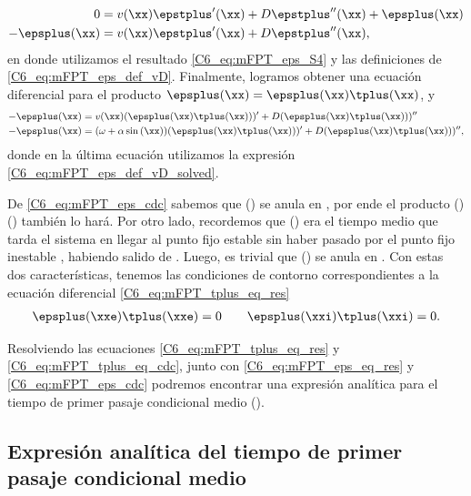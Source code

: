 {\begin{align}
       0 &= v(\xx) \epstplus'(\xx)  + D \epstplus''(\xx) + \epsplus(\xx)\\
       -\epsplus(\xx) &= v(\xx) \epstplus'(\xx)  + D \epstplus''(\xx),
\end{align}
en donde utilizamos el resultado \ref{C6_eq:mFPT_eps_S4} y las definiciones de \ref{C6_eq:mFPT_eps_def_vD}.
Finalmente, logramos obtener una ecuación diferencial para el producto $\epsplus(\xx) = \epsplus(\xx) \tplus(\xx)$, y
\begin{align}
       - \epsplus(\xx) &= v(\xx) (\epsplus(\xx) \tplus(\xx)))'  + D (\epsplus(\xx) \tplus(\xx)))''  \\
     - \epsplus(\xx) &= (\omega + \alpha \sin{(\xx)}) (\epsplus(\xx) \tplus(\xx)))'  + D (\epsplus(\xx) \tplus(\xx)))'' ,
       \label{C6_eq:mFPT_tplus_eq_res}
\end{align}
donde en la última ecuación utilizamos la expresión  \ref{C6_eq:mFPT_eps_def_vD_solved}.

De \ref{C6_eq:mFPT_eps_cdc} sabemos que \epsplus(\xx) se anula en \xxi, por ende el producto \epsplus(\xx) \tplus(\xx) también lo hará. Por otro lado, recordemos que \tplus(\xx) era el tiempo medio que tarda el sistema en llegar al punto fijo estable \xxe sin haber pasado por el punto fijo inestable \xxi, habiendo salido de \xx. Luego, es trivial que \tplus(\xx) se anula en \xxe. Con estas dos características, tenemos las condiciones de contorno correspondientes a la ecuación diferencial \ref{C6_eq:mFPT_tplus_eq_res}
\begin{align}
    \epsplus(\xxe) \tplus(\xxe) = 0 \qquad \epsplus(\xxi) \tplus(\xxi) = 0 .
    \label{C6_eq:mFPT_tplus_eq_cdc}
\end{align}

Resolviendo las ecuaciones \ref{C6_eq:mFPT_tplus_eq_res} y \ref{C6_eq:mFPT_tplus_eq_cdc}, junto con \ref{C6_eq:mFPT_eps_eq_res} y \ref{C6_eq:mFPT_eps_cdc} podremos encontrar una expresión analítica para el tiempo de primer pasaje condicional medio \tplus(\xx). 


\subsection{Expresión analítica del tiempo de primer pasaje condicional medio}

}

